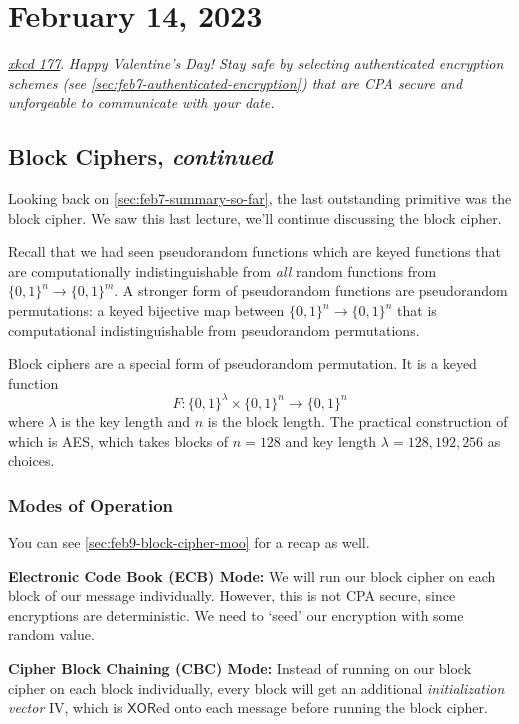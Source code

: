 \section{February 14, 2023}
\label{20230214}

\begin{center}
    \href{https://xkcd.com/177/}{\emph{xkcd 177}}. \emph{Happy Valentine's Day! Stay safe by selecting authenticated encryption schemes (see \cref{sec:feb7-authenticated-encryption}) that are CPA secure and unforgeable to communicate with your date.}
\end{center}

\subsection{Block Ciphers, \emph{continued}}
Looking back on \cref{sec:feb7-summary-so-far}, the last outstanding primitive was the block cipher. We saw this last lecture, we'll continue discussing the block cipher.

Recall that we had seen pseudorandom functions which are keyed functions that are computationally indistinguishable from \emph{all} random functions from $\{0, 1\}^n\to \{0, 1\}^m$. A stronger form of pseudorandom functions are pseudorandom permutations: a keyed bijective map between $\{0, 1\}^n\to \{0, 1\}^n$ that is computational indistinguishable from pseudorandom permutations.

Block ciphers are a special form of pseudorandom permutation. It is a keyed function
\[F : \{0, 1\}^\lambda\times \{0, 1\}^n\to \{0, 1\}^n\]
where $\lambda$ is the key length and $n$ is the block length. The practical construction of which is AES, which takes blocks of $n = 128$ and key length $\lambda = 128, 192, 256$ as choices.

\subsubsection{Modes of Operation}

You can see \cref{sec:feb9-block-cipher-moo} for a recap as well.

\textbf{Electronic Code Book (ECB) Mode:} We will run our block cipher on each block of our message individually. However, this is not CPA secure, since encryptions are deterministic. We need to `seed' our encryption with some random value.

\textbf{Cipher Block Chaining (CBC) Mode:} Instead of running on our block cipher on each block individually, every block will get an additional \emph{initialization vector} IV, which is $\mathsf{XOR}$ed onto each message before running the block cipher.

